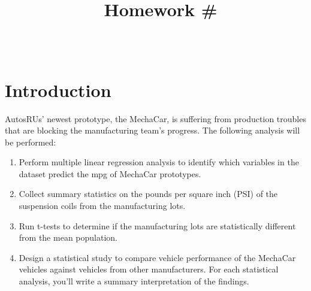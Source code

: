 \documentclass[a4paper, 12pt]{article}\usepackage[]{graphicx}\usepackage[]{color}
\title{\vspace{-.5in}\textmd{\textbf{\ Homework \# \hwnumber}}\\\crse\\\normalsize\semest\vspace{0in}}
\date{}
\author{\textbf{\stdnt}\normalsize\vspace{0.1in}}
\begin{document}
\maketitle
\tableofcontents









\section{Introduction}
  AutosRUs’ newest prototype, the MechaCar, is suffering from production troubles that are blocking the manufacturing team’s progress. The following analysis will be performed:
\begin{enumerate}
\item Perform multiple linear regression analysis to identify which variables   in the dataset predict the mpg of MechaCar prototypes. 
\item Collect summary statistics on the pounds per square inch (PSI) of the     suspension coils from the manufacturing lots. 
\item Run t-tests to determine if the manufacturing lots are statistically           different from the mean population. 
\item Design a statistical study to compare vehicle performance of the              MechaCar vehicles against vehicles from other manufacturers. For each       statistical analysis, you’ll write a summary interpretation of the          findings.
\end{enumerate}
  
\end{document}
